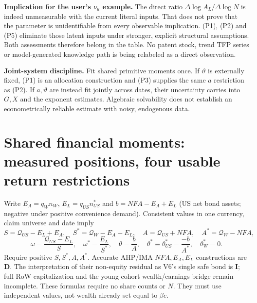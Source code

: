 \documentclass[10pt,a4paper,landscape]{article}
\newcommand{\Q}{\mathcal Q}\newcommand{\I}{\mathcal I}\newcommand{\D}{\mathcal D}
\newcommand{\dd}{\Delta\log}
\newcommand{\direct}{\textbf{D}}
\newcommand{\indirect}{\textbf{I}}
\begin{document}
\textbf{Implication for the user's $\nu_u$ example.} The direct ratio $\dd A_L/\dd N$ is indeed unmeasurable with the current literal inputs. That does not prove that the parameter is unidentifiable from every observable implication. (P1), (P2) and (P5) eliminate those latent inputs under stronger, explicit structural assumptions. Both assessments therefore belong in the table. No patent stock, trend TFP series or model-generated knowledge path is being relabeled as a direct observation.

\textbf{Joint-system discipline.} Fit shared primitive moments once. If $\vartheta$ is externally fixed, (P1) is an allocation construction and (P3) supplies the same $a$ restriction as (P2). If $a,\vartheta$ are instead fit jointly across dates, their uncertainty carries into $G,X$ and the exponent estimates. Algebraic solvability does not establish an econometrically reliable estimate with noisy, endogenous data.

\clearpage
\section{Shared financial moments: measured positions, four usable return restrictions}\label{sec:financial}
Write $E_A=q_Wn_W$, $E_L=q_{US}n^*_{US}$ and $b=NFA-E_A+E_L$ (US net bond assets; negative under positive convenience demand). Consistent values in one currency, claim universe and date imply
\[
 S=\Q_{US}-E_L+E_A,\quad S^*=\Q_W-E_A+E_L,\quad
 A=\Q_{US}+NFA,\quad A^*=\Q_W-NFA,
\]
\[
 \omega=\frac{\Q_{US}-E_L}{S},\quad \omega^*=\frac{E_L}{S^*},\quad
 \theta=\frac bA,\quad\theta^*\equiv\theta^*_{US}=\frac{-b}{A^*},\quad\theta_W^*=0.
\]
Require positive $S,S^*,A,A^*$. Accurate AHP/IMA $NFA,E_A,E_L$ constructions are \direct. The interpretation of their non-equity residual as V6's single safe bond is \indirect; full RoW capitalization and the young-cohort wealth/earnings bridge remain incomplete. These formulas require no share counts or $N$. They must use independent values, not wealth already set equal to $\beta e$.
\end{document}
